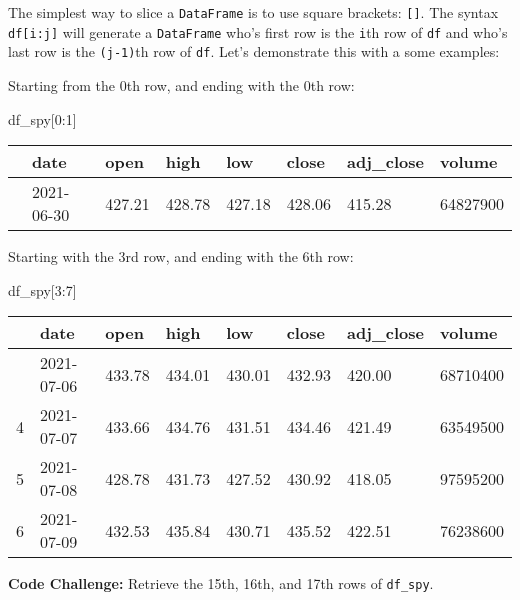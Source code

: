 \documentclass[
  letterpaper,
  DIV=11,
  numbers=noendperiod]{scrreprt}
\newenvironment{Shaded}{\begin{snugshade}}{\end{snugshade}}
\newcommand{\DecValTok}[1]{\textcolor[rgb]{0.68,0.00,0.00}{#1}}
\newcommand{\NormalTok}[1]{\textcolor[rgb]{0.00,0.23,0.31}{#1}}
\begin{document}
The simplest way to slice a \texttt{DataFrame} is to use square
brackets: \texttt{{[}{]}}. The syntax \texttt{df{[}i:j{]}} will generate
a \texttt{DataFrame} who's first row is the \texttt{i}th row of
\texttt{df} and who's last row is the \texttt{(j-1)}th row of
\texttt{df}. Let's demonstrate this with a some examples:

Starting from the 0th row, and ending with the 0th row:

\begin{Shaded}
\begin{Highlighting}[]
\NormalTok{df\_spy[}\DecValTok{0}\NormalTok{:}\DecValTok{1}\NormalTok{]}
\end{Highlighting}
\end{Shaded}

\begin{longtable}[]{@{}llllllll@{}}
\toprule\noalign{}
& date & open & high & low & close & adj\_close & volume \\
\midrule\noalign{}
\endhead
\bottomrule\noalign{}
\endlastfoot
0 & 2021-06-30 & 427.21 & 428.78 & 427.18 & 428.06 & 415.28 &
64827900 \\
\end{longtable}

Starting with the 3rd row, and ending with the 6th row:

\begin{Shaded}
\begin{Highlighting}[]
\NormalTok{df\_spy[}\DecValTok{3}\NormalTok{:}\DecValTok{7}\NormalTok{]}
\end{Highlighting}
\end{Shaded}

\begin{longtable}[]{@{}llllllll@{}}
\toprule\noalign{}
& date & open & high & low & close & adj\_close & volume \\
\midrule\noalign{}
\endhead
\bottomrule\noalign{}
\endlastfoot
3 & 2021-07-06 & 433.78 & 434.01 & 430.01 & 432.93 & 420.00 &
68710400 \\
4 & 2021-07-07 & 433.66 & 434.76 & 431.51 & 434.46 & 421.49 &
63549500 \\
5 & 2021-07-08 & 428.78 & 431.73 & 427.52 & 430.92 & 418.05 &
97595200 \\
6 & 2021-07-09 & 432.53 & 435.84 & 430.71 & 435.52 & 422.51 &
76238600 \\
\end{longtable}

\textbf{Code Challenge:} Retrieve the 15th, 16th, and 17th rows of
\texttt{df\_spy}.
\end{document}
